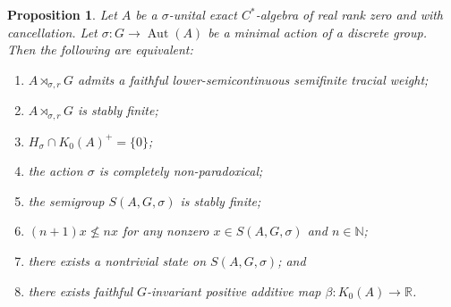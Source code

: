 \documentclass[a4paper, 12pt]{amsart}
\numberwithin{equation}{section}
\newcounter{theorem}
\newtheorem{prop}[theorem]{Proposition}
\theoremstyle{remark}
\theoremstyle{definition}
\begin{document}
\begin{prop}\label{prop.main.2}
Let $A$ be a $\sigma$-unital exact $C^*$-algebra of real rank zero and with cancellation.
Let $\sigma : G \to {\operatorname{Aut}}(A)$ be a minimal action of a discrete group. Then the following
are equivalent:
\begin{enumerate}
\item\label{prop.main.2.(1)} $A\rtimes_{\sigma,r} G$ admits a faithful lower-semicontinuous semifinite
    tracial weight;
\item\label{prop.main.2.(2)} $A\rtimes_{\sigma,r} G$ is stably finite;
\item\label{prop.main.2.(3)} $H_\sigma \cap K_0(A)^+ = \{0\}$;
\item\label{prop.main.2.(4)} the action $\sigma$ is completely non-paradoxical;
\item\label{prop.main.2.(5)} the semigroup $S(A,G,\sigma)$ is stably finite;
\item\label{prop.main.2.(6)} $(n+1)x\not\leq nx$ for any nonzero $x\in S(A,G,\sigma)$ and $n\in {\mathbb{N}}$;
\item\label{prop.main.2.(7)} there exists a nontrivial state on $S(A,G,\sigma)$; and
\item\label{prop.main.2.(8)} there exists faithful $G$-invariant positive additive map $\beta \colon
    K_0(A)\to {\mathbb{R}}$.
\end{enumerate}
\end{prop}
\end{document}
